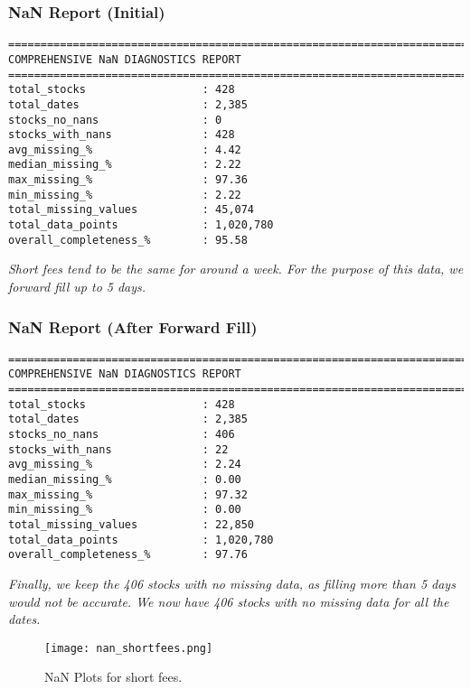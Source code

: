 \documentclass[11pt, letterpaper]{article}
\begin{document}
\subsubsection*{NaN Report (Initial)}
\begin{verbatim}
================================================================================
COMPREHENSIVE NaN DIAGNOSTICS REPORT
================================================================================
total_stocks                  : 428
total_dates                   : 2,385
stocks_no_nans                : 0
stocks_with_nans              : 428
avg_missing_%                 : 4.42
median_missing_%              : 2.22
max_missing_%                 : 97.36
min_missing_%                 : 2.22
total_missing_values          : 45,074
total_data_points             : 1,020,780
overall_completeness_%        : 95.58
\end{verbatim}
\textit{Short fees tend to be the same for around a week. For the purpose of this data, we forward fill up to 5 days.}

\subsubsection*{NaN Report (After Forward Fill)}
\begin{verbatim}
================================================================================
COMPREHENSIVE NaN DIAGNOSTICS REPORT
================================================================================
total_stocks                  : 428
total_dates                   : 2,385
stocks_no_nans                : 406
stocks_with_nans              : 22
avg_missing_%                 : 2.24
median_missing_%              : 0.00
max_missing_%                 : 97.32
min_missing_%                 : 0.00
total_missing_values          : 22,850
total_data_points             : 1,020,780
overall_completeness_%        : 97.76
\end{verbatim}
\textit{Finally, we keep the 406 stocks with no missing data, as filling more than 5 days would not be accurate. We now have 406 stocks with no missing data for all the dates.}


\begin{figure}[htbp]
    \centering
    \texttt{[image: nan\_shortfees.png]}
    \caption{NaN Plots for short fees.}
    \label{fig:nonnanprices_explore}
\end{figure}
\end{document}
